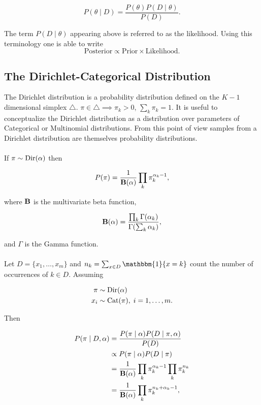 \documentclass[12pt]{report}
\newcommand{\1}[0]{\mathbbm{1}}
\newcommand{\Cat}[0]{\textnormal{Cat}}
\newcommand{\Dir}[0]{\textnormal{Dir}}
\newcommand{\Bf}[0]{\text{\textbf{B}}}
\begin{document}
\[
    P(\theta \mid D) = \frac{P(\theta)P(D \mid \theta)}{P(D)}.
\]

The term $P(D \mid \theta)$ appearing above is referred to as the likelihood.
Using this terminology one is able to write
\[
    \text{Posterior} \propto \text{Prior} \times \text{Likelihood}.
\]

\subsection{The Dirichlet-Categorical Distribution}
The Dirichlet distribution is a probability distribution defined on the $K-1$
dimensional simplex $\triangle$. $\pi \in \triangle \implies \pi_k > 0$, $\sum_k \pi_k = 1$.
It is useful to conceptualize the Dirichlet distribution as a distribution over
parameters of Categorical or Multinomial distributions. From this point of view
samples from a Dirichlet distribution are themselves probability distributions.
\\\\
If $\pi \sim \Dir(\alpha)$ then

\begin{equation}
    P(\pi) = \frac{1}{\Bf(\alpha)} \prod_k \pi_k^{\alpha_k-1}, \label{eq:dir-pdf}
\end{equation}

where $\Bf$ is the multivariate beta function,

\begin{equation}
    \Bf(\alpha) = \frac{\prod_k \Gamma(\alpha_k)}{\Gamma(\sum_k \alpha_k)}, \label{eq:betafunc}
\end{equation}

and $\Gamma$ is the Gamma function.
\\\\
Let $D = \{x_1, \ldots, x_m\}$ and $n_k = \sum_{x \in D} \1\{x = k\}$ count
the number of occurrences of $k \in D$. Assuming

\begin{align*}
    \pi & \sim \Dir(\alpha) \\
    x_i & \sim \Cat(\pi),\; i = 1, \ldots, m.
\end{align*}

Then

\begin{align*}
    P(\pi \mid D, \alpha)
    &= \frac{P(\pi \mid \alpha) P(D \mid \pi, \alpha)}{P(D)} \\
    & \propto P(\pi \mid \alpha) P(D \mid \pi) \\
    &= \frac{1}{\Bf(\alpha)} \prod_k \pi_k^{\alpha_k - 1} \prod_k \pi_k^{n_k} \\
    &= \frac{1}{\Bf(\alpha)} \prod_k \pi_k^{n_k + \alpha_k - 1},
\end{align*}
\end{document}

